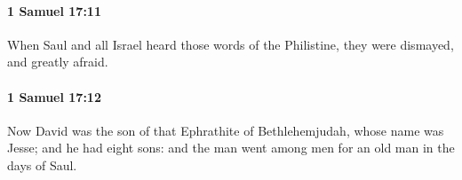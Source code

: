 		\paragraph{1 Samuel 17:11} %
			\label{1SAMUEL-17-11}

			When Saul and all Israel heard those words of the Philistine, they were dismayed, and greatly afraid.


		\paragraph{1 Samuel 17:12} %
			\label{1SAMUEL-17-12}

			Now David was the son of that Ephrathite of Bethlehemjudah, whose name was Jesse; and he had eight sons: and the man went among men for an old man in the days of Saul.


